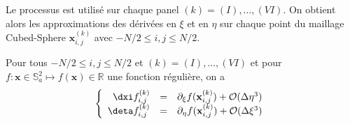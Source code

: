 Le processus est utilisé sur chaque panel $(k) = (I), \ldots , (VI)$. On obtient alors les approximations des dérivées en $\xi$ et en $\eta$ sur chaque point du maillage Cubed-Sphere $\mathbf{x}_{i,j}^{(k)}$ avec $-N/2 \leq i,j \leq N/2$.

\begin{theoreme}
Pour tous $-N/2 \leq i,j \leq N/2$ et $(k) = (I) , \ldots , (VI)$ et pour $f : \mathbf{x} \in \mathbb{S}_a^2 \mapsto f(\mathbf{x}) \in \mathbb{R}$ une fonction régulière, on a 
\begin{equation}
\left\lbrace
\begin{array}{rcl}
\dxi f_{i,j}^{(k)} & = & \partial_{\xi} f(\mathbf{x}_{i,j}^{(k)}) + \mathcal{O}(\Delta \eta^3) \\
\deta f_{i,j}^{(k)} & = & \partial_{\eta} f(\mathbf{x}_{i,j}^{(k)}) + \mathcal{O}(\Delta \xi^3)
\end{array}
\right.
\end{equation}
\label{th:consistance_der_xieta}
\end{theoreme}

